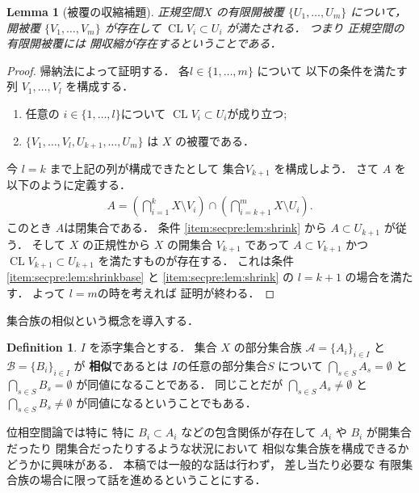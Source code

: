 \documentclass[leqno, a4paper, 12pt]{jsarticle}
\theoremstyle{plain}
\newtheorem{lem}[thm]{Lemma}
\theoremstyle{definition}
\newtheorem{df}{Definition}[section]
\theoremstyle{remark}
\DeclareMathOperator{\cl}{\mathrm{CL}}
\newcommand{\yoemph}[1]{\textbf{#1}}
\numberwithin{equation}{section}
\begin{document}
\begin{lem}[被覆の収縮補題]\label{lem:intro:shrink}
正規空間$X$
の有限開被覆
$\{U_{1}, \dots, U_{m}\}$
について，開被覆
$\{V_{1}, \dots, V_{m}\}$
が存在して
$\cl V_{i}\subset U_{i}$
が満たされる．
つまり
正規空間の
有限開被覆には
開収縮が存在するということである．
\end{lem}
\begin{proof}
帰納法によって証明する．
各$l\in \{1, \dots, m\}$
について
以下の条件を満たす列
$V_{1}, \dots, V_{l}$
を構成する．
\begin{enumerate}[label=\textup{(\arabic*)}]
\item\label{item:secpre:lem:shrinkbase}
任意の
$i\in \{1, \dots, l\}$について
$\cl V_{i}\subset U_{i}$が成り立つ; 
\item\label{item:secpre:lem:shrink}
$\{V_{1}, \dots, V_{l}, U_{k+1}, \dots, U_{m}\}$
は
$X$
の被覆である．
\end{enumerate}
今
$l=k$
まで上記の列が構成できたとして
集合$V_{k+1}$
を構成しよう．
さて
$A$
を以下のように定義する．
\begin{align}
A=\left(\bigcap_{i=1}^{k}X\setminus V_{i}\right)\cap 
\left(\bigcap_{i=k+1}^{m}X\setminus U_{i}\right). 
\end{align}
このとき
$A$は閉集合である．
条件
\ref{item:secpre:lem:shrink}
から
$A\subset U_{k+1}$
が従う．
そして
$X$
の正規性から
$X$
の開集合
$V_{k+1}$
であって
$A\subset V_{k+1}$
かつ
$\cl V_{k+1}\subset U_{k+1}$
を満たすものが存在する．
これは条件
\ref{item:secpre:lem:shrinkbase}
と
\ref{item:secpre:lem:shrink}
の
$l=k+1$
の場合を満たす．
よって
$l=m$の時を考えれば
証明が終わる．
\end{proof}


集合族の相似という概念を導入する．
\begin{df}
$I$
を添字集合とする．
集合
$X$
の部分集合族
$\mathcal{A}=\{A_{i}\}_{i\in I}$
と
$\mathcal{B}=\{B_{i}\}_{i\in I}$
が
\yoemph{相似}であるとは
$I$の任意の部分集合$S$
について
$\bigcap_{s\in S}A_{s}=\emptyset$
と
$\bigcap_{s\in S}B_{s}=\emptyset$
が同値になることである．
同じことだが
$\bigcap_{s\in S}A_{s}\neq \emptyset$
と
$\bigcap_{s\in S}B_{s}\neq\emptyset$
が同値になるということでもある．
\end{df}

位相空間論では特に
特に
$B_{i}\subset A_{i}$
などの包含関係が存在して
$A_{i}$
や
$B_{i}$
が開集合だったり
閉集合だったりするような状況において
相似な集合族を構成できるかどうかに興味がある．
本稿では一般的な話は行わず，
差し当たり必要な
有限集合族の場合に限って話を進めるということにする．
\end{document}
